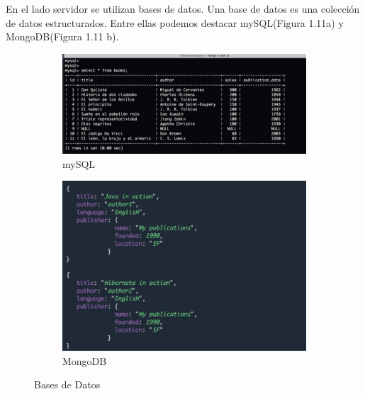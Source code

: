 En el lado servidor se utilizan bases de datos. Una base de datos es una colección de datos estructurados. Entre ellas podemos destacar mySQL(Figura 1.11a) y MongoDB(Figura 1.11 b). 

\begin{figure}[H]
  \begin{subfigure}[b]{0.5\textwidth}
  \centering
    \includegraphics[width=1\textwidth, height=0.7\textwidth]{chapters/images/mysql.png}
    \caption{mySQL}
    \label{fig:f1}
  \end{subfigure}
  \hfill
  \begin{subfigure}[b]{0.5\textwidth}
  \centering
    \includegraphics[width=1\textwidth, height=0.7\textwidth]{chapters/images/mongodb.png}
    \caption{MongoDB}
    \label{fig:f2}
  \end{subfigure}
  \caption{Bases de Datos}
\end{figure}



